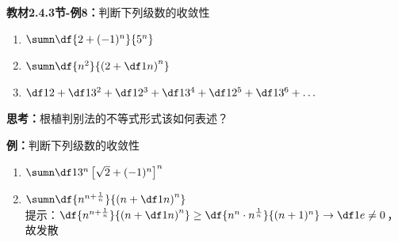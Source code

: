 {\bf 教材2.4.3节-例8：}判断下列级数的收敛性
\begin{enumerate} [(1)]
  \setlength{\itemindent}{1cm}
  \item $\sumn\df{2+(-1)^n}{5^n}$
  \item $\sumn\df{n^2}{\left(2+\df 1n\right)^n}$
  \item $\df 12+\df 1{3^2}+\df 1{2^3}+\df 1{3^4}+\df 1{2^5}+\df 1{3^6}+\ldots$
\end{enumerate}


{\bf 思考：}根植判别法的不等式形式该如何表述？

{\bf 例：}判断下列级数的收敛性
\begin{enumerate} [(1)]
  \setlength{\itemindent}{1cm}
  \item $\sumn\df1{3^n}\left[\sqrt2+(-1)^n\right]^n$
  \item $\sumn\df{n^{n+\frac1n}}{\left(n+\df1n\right)^n}$\\
  提示：$\df{n^{n+\frac1n}}{\left(n+\df1n\right)^n}\geq\df{n^n\cdot
  n^{\frac1n}}{(n+1)^n}\to\df1e\ne0$，故发散
\end{enumerate}

